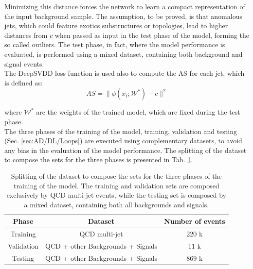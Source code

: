 \noindent Minimizing this distance forces the network to learn a compact representation of the input background sample.  
The assumption, to be proved, is that anomalous jets, which could feature exotics substructures or topologies, lead to higher distances from $c$ when passed as input in the test phase of the model, forming the so called outliers.
The test phase, in fact, where the model performance is evaluated, is performed using a mixed dataset, containing both background and signal events.\\
The DeepSVDD loss function is used also to compute the AS for each jet, which is defined as:
\begin{equation}\label{eq:ADJJ/GNN/train/AS}
    AS = \|\phi(x_i; \mathcal{W^*}) - c\|^2
\end{equation}

\noindent where $\mathcal{W^*}$ are the weights of the trained model, which are fixed during the test phase.\\
The three phases of the training of the model, training, validation and testing (Sec. \ref{sec:AD/DL/Loops}) are executed using complementary datasets, to avoid any bias in the evaluation of the model performance.
The splitting of the dataset to compose the sets for the three phases is presented in Tab. \ref{tab:ADJJ/GNN/train/datasetSplit}.

\begin{table}[htbp]
\centering
\begin{tabular}{|c|c|c|}
\hline
\rowcolor{lightgray}
\textbf{Phase} & \textbf{Dataset} & \textbf{Number of events} \\
\hline\hline
Training & QCD multi-jet & 220 k \\
\hline
Validation & QCD + other Backgrounds + Signals & 11 k \\
\hline
Testing & QCD + other Backgrounds + Signals & 869 k \\
\hline
\end{tabular}
\caption{Splitting of the dataset to compose the sets for the three phases of the training of the model. The training and validation sets are composed exclusively by QCD multi-jet events, while the testing set is composed by a mixed dataset, containing both all backgrounds and signals.}
\label{tab:ADJJ/GNN/train/datasetSplit}
\end{table}


